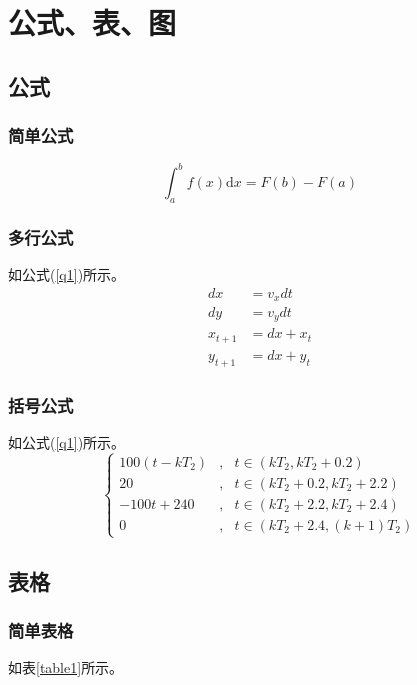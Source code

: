 \documentclass{nwputhesis}
\begin{document}
\section{公式、表、图}
\subsection{公式}
\subsubsection{简单公式}
\begin{equation}
  \int_a^b f(x)\mathrm{d}x=F(b)-F(a)
\end{equation}

\subsubsection{多行公式}
如公式(\ref{q1})所示。
\begin{equation}
\label{q1}
\begin{aligned}
dx&=v_{x}dt\\
 dy&=v_{y}dt\\
x_{t+1}&=dx+x_{t}\\
y_{t+1}&=dx+y_{t}
\end{aligned}
\end{equation}

\subsubsection{括号公式}
如公式(\ref{q1})所示。
\begin{equation}
\left\{
\begin{aligned}
 100(t-kT_{2})   & , & t\in (kT_{2}, kT_{2}+0.2 )\\
20&,  & t\in (kT_{2}+0.2,kT_{2}+2.2)\\
-100t+240  & , & t\in( kT_{2}+2.2, kT_{2}+2.4)\\
0&,  & t\in (kT_{2}+2.4,(k+1)T_{2})
\end{aligned}
\right.
\end{equation}

\subsection{表格}
\subsubsection{简单表格}
如表\ref{table1}所示。
\end{document}
